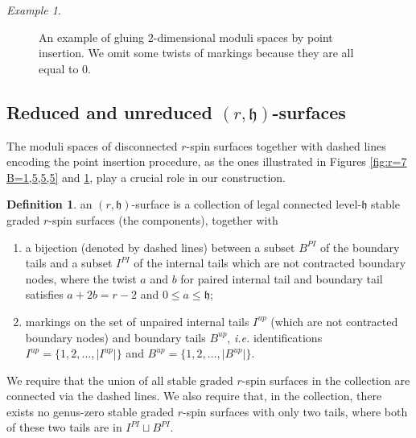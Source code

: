 \documentclass[11pt,a4paper]{article}
\theoremstyle{definition}
\newtheorem{dfn}[dummy]{Definition}
\theoremstyle{remark}
\newtheorem{ex}[dummy]{Example}
\numberwithin{equation}{section}
\def\h{{\mathfrak h}}
\begin{document}
\begin{ex}
\begin{figure}[h]
        \caption{An example of gluing $2$-dimensional moduli spaces by point insertion. We omit some twists of markings because they are all equal to $0$.}
        \label{fig:point insertion for r=2 k=3 l=1}
    \end{figure}




    

    
\end{ex} 


\subsection{Reduced and unreduced $(r,\h)$-surfaces}

The moduli spaces of disconnected $r$-spin surfaces together with dashed lines encoding the point insertion procedure, as the ones illustrated in Figures \ref{fig:r=7 B=1,5,5,5} and \ref{fig:point insertion for r=2 k=3 l=1}, play a crucial role in our construction.
\begin{dfn}\label{dfn rh graph}
    an $(r,\h)$-surface is a collection of legal connected level-$\h$ stable graded $r$-spin surfaces (the components), together with
    \begin{enumerate}
        \item a bijection (denoted by dashed lines) between a subset $B^{PI}$ of the boundary tails and  a subset $I^{PI}$ of the internal tails  which are not contracted boundary nodes,  where the twist $a$ and $b$ for paired internal tail and boundary tail satisfies $a+2b=r-2$ and $0\le a\le \h$;
        \item markings on the set of unpaired internal tails $I^{up}$ (which are not contracted boundary nodes) and boundary tails $B^{up}$, \textit{i.e.} identifications $I^{up}=\{1,2,\dots,\lvert I^{up}\rvert\}$ and $B^{up}=\{1,2,\dots,\lvert B^{up}\rvert\}$.
    \end{enumerate}
    We require that the union of all stable graded $r$-spin surfaces in the collection are connected via the dashed lines. We also require that, in the collection, there exists no genus-zero stable graded $r$-spin surfaces with only two tails, where both of these two tails are in $I^{PI}\sqcup B^{PI}$.
\end{dfn}
\end{document}
